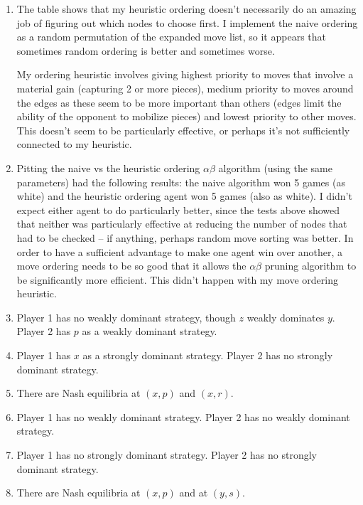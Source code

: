 \documentclass[12pt]{article}
\begin{document}
\begin{enumerate}
\item The table shows that my heuristic ordering doesn't necessarily do an amazing job of figuring out which nodes to choose first. I implement the naive ordering as a random permutation of the expanded move list, so it appears that sometimes random ordering is better and sometimes worse. 

	My ordering heuristic involves giving highest priority to moves that involve a material gain (capturing 2 or more pieces), medium priority to moves around the edges as these seem to be more important than others (edges limit the ability of the opponent to mobilize pieces) and lowest priority to other moves. This doesn't seem to be particularly effective, or perhaps it's not sufficiently connected to my heuristic.

\item Pitting the naive vs the heuristic ordering $\alpha\beta$ algorithm (using the same parameters) had the following results: the naive algorithm won 5 games (as white) and the heuristic ordering agent won 5 games (also as white). I didn't expect either agent to do particularly better, since the tests above showed that neither was particularly effective at reducing the number of nodes that had to be checked -- if anything, perhaps random move sorting was better. In order to have a sufficient advantage to make one agent win over another, a move ordering needs to be so good that it allows the $\alpha\beta$ pruning algorithm to be significantly more efficient. This didn't happen with my move ordering heuristic. 

\item Player 1 has no weakly dominant strategy, though $z$ weakly dominates $y$. Player 2 has $p$ as a weakly dominant strategy.

\item Player 1 has $x$ as a strongly dominant strategy. Player 2 has no strongly dominant strategy.

\item There are Nash equilibria at $(x,p)$ and $(x, r)$. 

\item Player 1 has no weakly dominant strategy. Player 2 has no weakly dominant strategy.

\item Player 1 has no strongly dominant strategy. Player 2 has no strongly dominant strategy.

\item There are Nash equilibria at $(x,p)$ and at $(y,s)$.
\end{enumerate}
\end{document}
